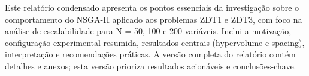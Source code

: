 Este relatório condensado apresenta os pontos essenciais da investigação sobre o comportamento do NSGA-II aplicado aos problemas ZDT1 e ZDT3, com foco na análise de escalabilidade para N = 50, 100 e 200 variáveis. Inclui a motivação, configuração experimental resumida, resultados centrais (hypervolume e spacing), interpretação e recomendações práticas. A versão completa do relatório contém detalhes e anexos; esta versão prioriza resultados acionáveis e conclusões-chave.